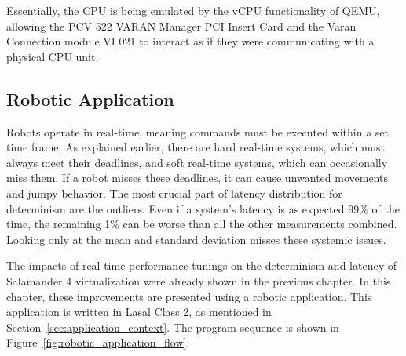 \documentclass[MMR,Master,english]{style/twbook}
\begin{document}
\noindent Essentially, the CPU is being emulated by the vCPU functionality of QEMU, allowing the PCV 522 VARAN Manager PCI Insert Card and the Varan Connection module VI 021 to interact as if they were communicating with a physical CPU unit.

\subsection{Robotic Application}

Robots operate in real-time, meaning commands must be executed within a set time frame. As explained earlier, there are hard real-time systems, which must always meet their deadlines, and soft real-time systems, which can occasionally miss them. If a robot misses these deadlines, it can cause unwanted movements and jumpy behavior. The most crucial part of latency distribution for determinism are the outliers. Even if a system's latency is as expected 99\% of the time, the remaining 1\% can be worse than all the other measurements combined. Looking only at the mean and standard deviation misses these systemic issues.

\bigskip \noindent The impacts of real-time performance tunings on the determinism and latency of Salamander 4 virtualization were already shown in the previous chapter. In this chapter, these improvements are presented using a robotic application. This application is written in Lasal Class 2, as mentioned in Section~\ref{sec:application_context}. The program sequence is shown in Figure~\ref{fig:robotic_application_flow}.

\vspace{2em}
\end{document}
